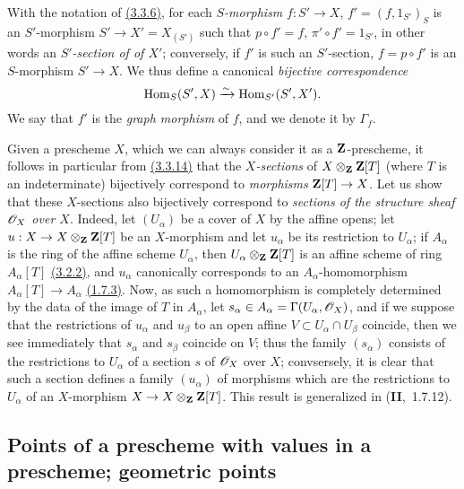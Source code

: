 \begin{env}[3.3.14]
\label{env-1.3.3.14}
With the notation of \hyperref[env-1.3.3.6]{(3.3.6)}, for each {\em $S$-morphism}
$f:S'\to X$, $f'=(f,1_{S'})_S$ is an $S'$-morphism $S'\to X'=X_{(S')}$ such that
$p\circ f'=f$, $\pi'\circ f'=1_{S'}$, in other words an {\em $S'$-section of
of $X'$}; conversely, if $f'$ is such an $S'$-section, $f=p\circ f'$ is an
$S$-morphism $S'\to X$. We thus define a canonical
{\em bijective correspondence}
\[
  {\mathop{\mathrm{Hom}}\nolimits}_S(S',X)\xrightarrow{\sim}{\mathop{\mathrm{Hom}}\nolimits}_{S'}(S',X').
\]
We say that $f'$ is the {\em graph morphism} of $f$, and we denote it by
$\Gamma_f$.
\end{env}

\begin{env}[3.3.15]
\label{env-1.3.3.15}
Given a prescheme $X$, which we can always consider it as a $\mathbf{Z}$-prescheme,
it follows in particular from \hyperref[env-1.3.3.14]{(3.3.14)} that the {\em $X$-sections} of
$X\otimes_\mathbf{Z}\mathbf{Z}[T]$ (where $T$ is an indeterminate) bijectively
correspond to {\em morphisms} $\mathbf{Z}[T]\to X$. Let us show that these
$X$-sections also bijectively correspond to {\em sections of the structure
sheaf $\mathscr{O}_X$ over $X$}. Indeed, let $(U_\alpha)$ be a cover of $X$ by the
affine opens; let $u:X\to X\otimes_\mathbf{Z}\mathbf{Z}[T]$ be an $X$-morphism and let
$u_\alpha$ be its restriction to $U_\alpha$; if $A_\alpha$ is the ring of the
affine scheme $U_\alpha$, then $U_\alpha\otimes_\mathbf{Z}\mathbf{Z}[T]$ is an affine
scheme of ring $A_\alpha[T]$ \hyperref[prop-1.3.2.2]{(3.2.2)}, and $u_\alpha$ canonically
corresponds to an $A_\alpha$-homomorphism $A_\alpha[T]\to A_\alpha$
\hyperref[thm-1.1.7.3]{(1.7.3)}. Now, as such a homomorphism is completely determined by the
data of the image of $T$ in $A_\alpha$, let
$s_\alpha\in A_\alpha=\Gamma(U_\alpha,\mathscr{O}_X)$, and if we suppose that the
restrictions of $u_\alpha$ and $u_\beta$ to an open affine
$V\subset U_\alpha\cap U_\beta$ coincide, then we see immediately that
$s_\alpha$ and $s_\beta$ coincide on $V$; thus the family $(s_\alpha)$ consists
of the restrictions to $U_\alpha$ of a section $s$ of $\mathscr{O}_X$ over $X$;
convsersely, it is clear that such a section defines a family $(u_\alpha)$ of
morphisms which are the restrictions to $U_\alpha$ of an $X$-morphism
$X\to X\otimes_\mathbf{Z}\mathbf{Z}[T]$. This result is generalized in
(\textbf{II},~1.7.12).
\end{env}

\subsection{Points of a prescheme with values in a prescheme; geometric points}
\label{subsection-prescheme-geometric-points}

